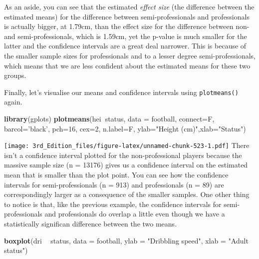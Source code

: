 \documentclass[
]{book}
\newenvironment{Shaded}{\begin{snugshade}}{\end{snugshade}}
\newcommand{\DataTypeTok}[1]{\textcolor[rgb]{0.13,0.29,0.53}{#1}}
\newcommand{\DecValTok}[1]{\textcolor[rgb]{0.00,0.00,0.81}{#1}}
\newcommand{\KeywordTok}[1]{\textcolor[rgb]{0.13,0.29,0.53}{\textbf{#1}}}
\newcommand{\NormalTok}[1]{#1}
\newcommand{\OperatorTok}[1]{\textcolor[rgb]{0.81,0.36,0.00}{\textbf{#1}}}
\newcommand{\StringTok}[1]{\textcolor[rgb]{0.31,0.60,0.02}{#1}}
\begin{document}
As an aside, you can see that the estimated \emph{effect size} (the difference between the estimated means) for the difference between semi-professionals and professionals is actually bigger, at 1.79cm, than the effect size for the difference between non- and semi-professionals, which is 1.59cm, yet the p-value is much smaller for the latter and the confidence intervals are a great deal narrower. This is because of the smaller sample sizes for professionals and to a lesser degree semi-professionals, which means that we are less confident about the estimated means for these two groups.

Finally, let's visualise our means and confidence intervals using \texttt{plotmeans()} again.

\begin{Shaded}
\begin{Highlighting}[]
\KeywordTok{library}\NormalTok{(gplots)}
\KeywordTok{plotmeans}\NormalTok{(hei}\OperatorTok{~}\NormalTok{status, }\DataTypeTok{data =}\NormalTok{ football, }\DataTypeTok{connect=}\NormalTok{F, }\DataTypeTok{barcol=}\StringTok{'black'}\NormalTok{, }\DataTypeTok{pch=}\DecValTok{16}\NormalTok{, }\DataTypeTok{cex=}\DecValTok{2}\NormalTok{, }\DataTypeTok{n.label=}\NormalTok{F, }\DataTypeTok{ylab=}\StringTok{"Height (cm)"}\NormalTok{,}\DataTypeTok{xlab=}\StringTok{"Status"}\NormalTok{)}
\end{Highlighting}
\end{Shaded}

\texttt{[image: 3rd\_Edition\_files/figure-latex/unnamed-chunk-523-1.pdf]}
There isn't a confidence interval plotted for the non-professional players because the massive sample size (n = 13176) gives us a confidence interval on the estimated mean that is smaller than the plot point. You can see how the confidence intervals for semi-professionals (n = 913) and professionals (n = 89) are correspondingly larger as a consequence of the smaller samples. One other thing to notice is that, like the previous example, the confidence intervals for semi-professionals and professionals do overlap a little even though we have a statistically significan difference between the two means.

\begin{Shaded}
\begin{Highlighting}[]

\KeywordTok{boxplot}\NormalTok{(dri }\OperatorTok{~}\StringTok{ }\NormalTok{status, }
        \DataTypeTok{data =}\NormalTok{ football,}
        \DataTypeTok{ylab =} \StringTok{"Dribbling speed"}\NormalTok{,}
        \DataTypeTok{xlab =} \StringTok{"Adult status"}\NormalTok{)}
\end{Highlighting}
\end{Shaded}
\end{document}
